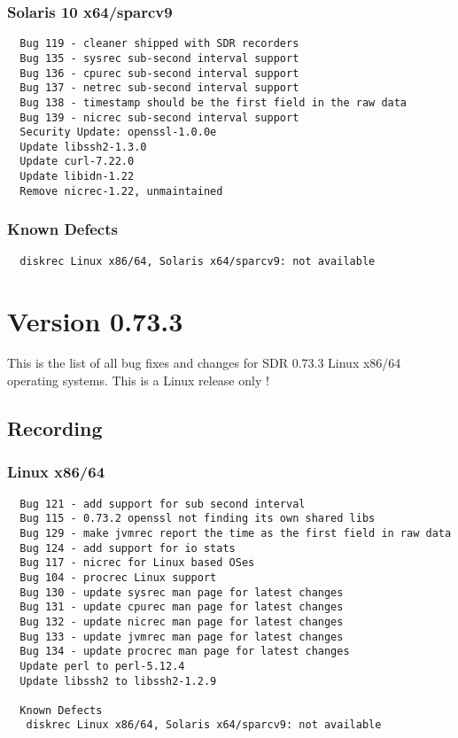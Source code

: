 \subsubsection*{Solaris 10 x64/sparcv9}
\begin{verbatim}
  Bug 119 - cleaner shipped with SDR recorders
  Bug 135 - sysrec sub-second interval support
  Bug 136 - cpurec sub-second interval support
  Bug 137 - netrec sub-second interval support
  Bug 138 - timestamp should be the first field in the raw data
  Bug 139 - nicrec sub-second interval support
  Security Update: openssl-1.0.0e
  Update libssh2-1.3.0
  Update curl-7.22.0
  Update libidn-1.22
  Remove nicrec-1.22, unmaintained
\end{verbatim}

\subsubsection*{Known Defects}
\begin{verbatim}
  diskrec Linux x86/64, Solaris x64/sparcv9: not available
\end{verbatim}



\section{Version 0.73.3}
\noindent
This is the list of all bug fixes and changes for SDR 0.73.3 Linux x86/64
operating systems. This is a Linux release only !

\subsection*{Recording}
\subsubsection*{Linux x86/64}

\begin{verbatim}
  Bug 121 - add support for sub second interval
  Bug 115 - 0.73.2 openssl not finding its own shared libs
  Bug 129 - make jvmrec report the time as the first field in raw data
  Bug 124 - add support for io stats
  Bug 117 - nicrec for Linux based OSes
  Bug 104 - procrec Linux support
  Bug 130 - update sysrec man page for latest changes
  Bug 131 - update cpurec man page for latest changes
  Bug 132 - update nicrec man page for latest changes
  Bug 133 - update jvmrec man page for latest changes
  Bug 134 - update procrec man page for latest changes
  Update perl to perl-5.12.4
  Update libssh2 to libssh2-1.2.9

  Known Defects
   diskrec Linux x86/64, Solaris x64/sparcv9: not available
\end{verbatim}


